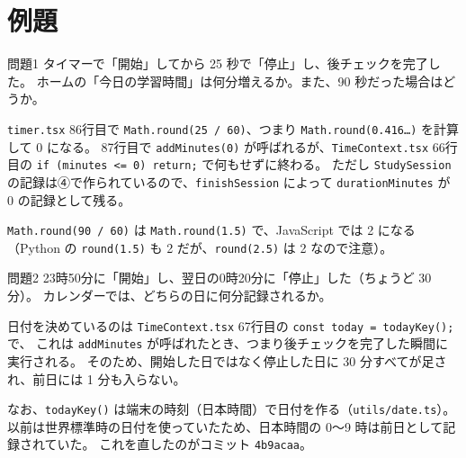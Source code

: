 \section{例題}

\begin{kkbadgeexample}{問題1}
  タイマーで「開始」してから 25 秒で「停止」し、後チェックを完了した。
  ホームの「今日の学習時間」は何分増えるか。また、90 秒だった場合はどうか。
\end{kkbadgeexample}
\begin{kkbadgenote}[解答]
  \texttt{timer.tsx} 86行目で \texttt{Math.round(25 / 60)}、つまり \texttt{Math.round(0.416…)} を計算して 0 になる。
  87行目で \texttt{addMinutes(0)} が呼ばれるが、\texttt{TimeContext.tsx} 66行目の \texttt{if (minutes <= 0) return;} で何もせずに終わる。
  ただし \texttt{StudySession} の記録は④で作られているので、\texttt{finishSession} によって \texttt{durationMinutes} が 0 の記録として残る。

  \texttt{Math.round(90 / 60)} は \texttt{Math.round(1.5)} で、JavaScript では 2 になる（Python の \texttt{round(1.5)} も 2 だが、\texttt{round(2.5)} は 2 なので注意）。
\end{kkbadgenote}

\begin{kkbadgeexample}[日付をまたぐとどうなるか]{問題2}
  23時50分に「開始」し、翌日の0時20分に「停止」した（ちょうど 30 分）。
  カレンダーでは、どちらの日に何分記録されるか。
\end{kkbadgeexample}
\begin{kkbadgenote}[解答]
  日付を決めているのは \texttt{TimeContext.tsx} 67行目の \texttt{const today = todayKey();} で、
  これは \texttt{addMinutes} が呼ばれたとき、つまり後チェックを完了した瞬間に実行される。
  そのため、開始した日ではなく停止した日に 30 分すべてが足され、前日には 1 分も入らない。

  なお、\texttt{todayKey()} は端末の時刻（日本時間）で日付を作る（\texttt{utils/date.ts}）。
  以前は世界標準時の日付を使っていたため、日本時間の 0〜9 時は前日として記録されていた。
  これを直したのがコミット \texttt{4b9acaa}。\evCode
\end{kkbadgenote}

